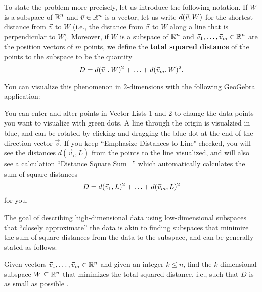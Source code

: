 \documentclass{ximera}
\begin{document}
To state the problem more precisely, let us introduce the following
notation. If $W$ is a subspace of $\mathbb{R}^n$ and $\vec{v}\in\mathbb{R}^n$ is a
vector, let us write $d(\vec{v},W)$ for the shortest distance from
$\vec{v}$ to $W$ (i.e., the distance from $\vec{v}$ to $W$ along a
line that is perpendicular to $W$). Moreover, if $W$ is a subspace of
$\mathbb{R}^n$ and $\vec{v}_1,\ldots,\vec{v}_m\in\mathbb{R}^n$ are the position
vectors of $m$ points, we define the \textbf{total squared distance}%
%
%
%
 of the points to
the subspace to be the quantity
\begin{equation*}
  D = d(\vec{v}_1,W)^2 + \ldots + d(\vec{v}_m,W)^2.
\end{equation*}

You can visualize this phenomenon in $2$-dimensions with the following GeoGebra application:

\begin{center}
\end{center}



You can enter and alter points in Vector Lists 1 and 2 to change the data points you want to visualize with green dots. A line through the origin is visualzied in blue, and can be rotated by clicking and dragging the blue dot at the end of the direction vector $\vec{v}$. If you keep ``Emphasize Distances to Line" checked, you will see the distances $d(\vec{v}_i,L)$ from the points to the line visualized, and will also see a calculation ``Distance Square Sum='' which automatically calculates the sum of square distances \begin{equation*}
  D = d(\vec{v}_1,L)^2 + \ldots + d(\vec{v}_m,L)^2
\end{equation*} for you.

The goal of describing high-dimensional data using low-dimensional subspaces that ``closely approximate'' the data is akin to finding subspaces that minimize the sum of square distances from the data to the subspace, and can be generally stated as follows:


 
\begin{problem}\label{prop:subspace-fitting}

  Given vectors $\vec{v}_1,\ldots,\vec{v}_m\in\mathbb{R}^n$ and given an
  integer $k\leq n$, find the $k$-dimensional subspace
  $W\subseteq\mathbb{R}^n$ that minimizes the total squared distance, i.e.,
  such that $D$ is as small as possible%
  .
\end{problem}
\end{document}
